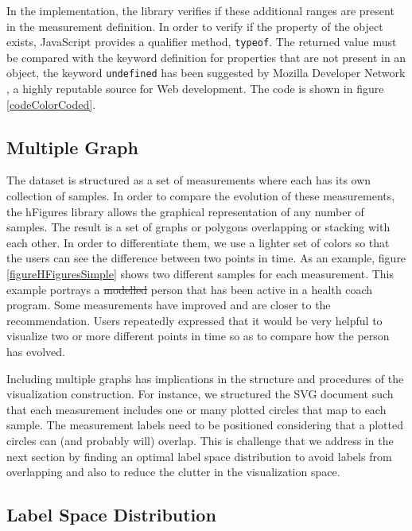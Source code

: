 \documentclass[twocolumn]{bmcart}%
\providecommand{\DIFadd}[1]{{\protect\color{blue}\uwave{#1}}} %
\providecommand{\DIFdel}[1]{{\protect\color{red}\sout{#1}}}                      %
\providecommand{\DIFaddbegin}{} %
\providecommand{\DIFaddend}{} %
\providecommand{\DIFdelbegin}{} %
\providecommand{\DIFdelend}{} %
\begin{document}
In the implementation, the library verifies if these additional ranges are present in the measurement definition. In order to verify if the property of the object exists, JavaScript provides a qualifier method, \texttt{typeof}. The returned value must be compared with the keyword definition for properties that are not present in an object, the keyword \texttt{undefined} has been suggested by Mozilla Developer Network \cite{MDNJS}, a highly reputable source for Web development. The code is shown in figure \ref{codeColorCoded}.

\subsection*{Multiple Graph}

The dataset is structured as a set of measurements where each has its own collection of samples. In order to compare the evolution of these measurements, the hFigures library allows the graphical representation of any number of samples. The result is a set of graphs or polygons overlapping or stacking with each other. In order to differentiate them, we use a lighter set of colors so that the users can see the difference between two points in time. As an example, figure \ref{figureHFiguresSimple} shows two different samples for each measurement. This example portrays a \DIFdelbegin \DIFdel{modelled }\DIFdelend \DIFaddbegin \DIFadd{modeled }\DIFaddend person that has been active in a health coach program. Some measurements have improved and are closer to the recommendation. Users repeatedly expressed that it would be very helpful to visualize two or more different points in time so as to compare how the person has evolved. 

Including multiple graphs has implications in the structure and procedures of the visualization construction. For instance, we structured the SVG document such that each measurement includes one or many plotted circles that map to each sample. The measurement labels need to be positioned considering that a plotted circles can (and probably will) overlap. This is challenge that we address in the next section by finding an optimal label space distribution to avoid labels from overlapping and also to reduce the clutter in the visualization space.

\subsection*{Label Space Distribution}
\end{document}
